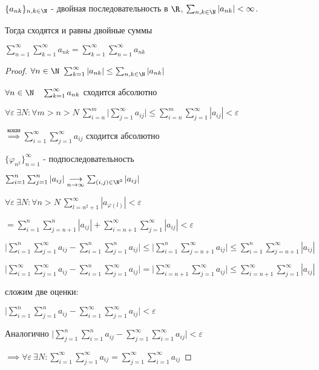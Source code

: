   \begin{theorem}
    $\{a_{nk}\}_{n,k \in\N}$ - двойная последовательность в $\R$,
    $\sum_{n,k \in \N} |a_{nk}| < \infty$.

    Тогда сходятся и равны двойные суммы 

    $\sum^\infty_{n=1}\sum_{k=1}^\infty a_{nk} = \sum^\infty_{k=1}\sum^\infty_{n=1} a_{nk}$
  \end{theorem}
  \begin{proof}
    $\forall n \in \N \ \sum^\infty_{k=1} | a_{nk} | \le \sum_{n,k \in \N} |a_{nk}| $

    $\forall n \in \N \quad \sum^\infty_{k=1} a_{nk}$ сходится абсолютно

    $\forall \varepsilon \ \exists N: \forall m > n > N \ \sum^m_{i=n}\big| \sum^\infty_{j=1} a_{ij}\big| \le \sum^m_{i=n}\sum^\infty_{j=1} | a_{ij}| < \varepsilon$
    
    $\overset{\text{коши}}{\implies} \sum^\infty_{i=1}\sum^\infty_{j=1} a_{ij}$ сходится абсолютно
  
    $\{\varphi_{n^2}\}^\infty_{n=1}$ - подпоследовательность

    $\sum^n_{i=1}\sum^n_{j=1}|a_{ij}| \underset{n\to\infty}{\longrightarrow} \sum_{(i,j) \in \N^2} |a_{ij}|$

    $\forall \varepsilon \ \exists N: \forall n > N \ \sum^\infty_{l=n^2+1}|a_{\varphi(l)}| < \varepsilon$

    $ = \sum^n_{i=1}\sum^n_{j=n+1} |a_{ij}| + \sum_{i=n+1}^\infty\sum^\infty_{j=1} |a_{ij}| < \varepsilon$

    $\Big|\sum^n_{i=1}\sum^\infty_{j=1} a_{ij} - \sum^n_{i=1}\sum^n_{j=1}a_{ij}\Big| \le \Big| \sum^n_{i=1}\sum^\infty_{j=n+1}a_{ij}\Big|
    \le \sum^n_{i=1}\sum^\infty_{j=n+1} |a_{ij}|$

    $\Big| \sum^\infty_{i=1}\sum^\infty_{j=1} a_{ij} - \sum^n_{i=1}\sum^\infty_{j=1} a_{ij}\Big| = \Big| \sum^\infty_{i=n+1}\sum^\infty_{j=1}a_{ij}\Big| \le \sum_{i=n+1}^\infty\sum_{j=1}^\infty | a_{ij}|$

    сложим две оценки:

    $\Big|\sum^n_{i=1}\sum^n_{j=1}a_{ij} - \sum^\infty_{i=1}\sum^\infty_{j=1} a_{ij} \Big| < \varepsilon$

    Аналогично $\Big|\sum_{j=1}^n\sum_{i=1}^n a_{ij}- \sum^\infty_{j=1}\sum^\infty_{i=1} a_{ij} \Big|< \varepsilon$

    $\implies \forall \varepsilon \ \exists N: \sum^\infty_{i=1}\sum^\infty_{j=1}a_{ij} = \sum^\infty_{j=1}\sum^\infty_{i=1} a_{ij}$
  \end{proof}

